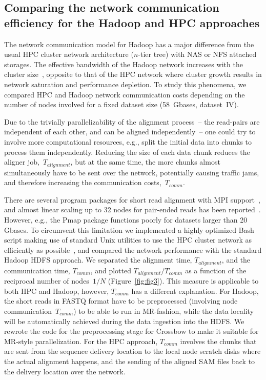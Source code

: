 \documentclass[10pt]{article}
\begin{document}
 \subsection*{Comparing the network communication efficiency for the Hadoop and HPC approaches }
The network communication model for Hadoop has a major difference from the usual HPC cluster network architecture ($n$-tier tree) with NAS or NFS attached storages. The effective bandwidth of the Hadoop network increases with the cluster size~\cite{Sammer:2012}, opposite to that of the HPC network where cluster growth results in network saturation and performance depletion.
To study this phenomena, we compared HPC and Hadoop network communication costs depending on the number of nodes involved for a fixed dataset size (58~Gbases, dataset~IV).
 
Due to the trivially parallelizability of the alignment process~-- the read-pairs are independent of each other, and can be aligned independently~-- one could try to involve more computational resources, e.g., split the initial data into chunks to process them independently.
Reducing the size of each data chunk reduces the aligner  job,~$T_{alignment}$, but at the same time, the more chunks almost simultaneously have to be sent over the network, potentially causing traffic jams, and therefore increasing the communication costs,~$T_{comm}$.

There are several program packages for short read alignment with MPI support~\cite{pmap, gnumap}, and almost linear scaling up to 32 nodes for pair-ended reads has been reported~\cite{Bozdag:2010cn}. However, e.g., the Pmap package functions poorly for datasets larger than 20 Gbases. To circumvent this limitation we implemented a highly optimized Bash script making use of standard Unix utilities to use the HPC cluster network as efficiently as possible~\cite{code_repo_bash}, and compared the network performance with the standard Hadoop HDFS approach. We separated the alignment time, $T_{alignment}$, and the communication time, $T_{comm}$, and plotted $T_{alignment}/T_{comm}$ as a function of the reciprocal number of nodes~$1/N$ (Figure~\ref{fig:fig3}). 
This measure is applicable to both HPC and Hadoop, however, $T_{comm}$ has a different explanation. For Hadoop, the short reads in FASTQ format have to be preprocessed (involving node communication~$T_{comm}$) to be able to run in MR-fashion, while the data locality will be automatically achieved during the data ingestion into the HDFS. 
We rewrote the code for the preprocessing stage for Crossbow to make it suitable for MR-style parallelization.
For the HPC approach, $T_{comm}$ involves the chunks that are sent from the sequence delivery location to the local node scratch disks where the actual alignment happens, and the sending of the aligned SAM files back to the delivery location over the network.
\end{document}
